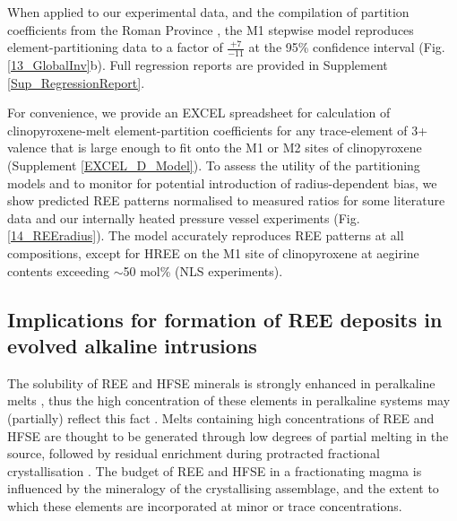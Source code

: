 \documentclass[review,authoryear,12pt]{elsarticle}
\begin{document}
When applied to our experimental data, and the compilation of partition coefficients from the Roman Province \citep{Fedele2009, Mollo2013, Mollo2016}, the M1 stepwise model reproduces element-partitioning data to a factor of $\frac{+7}{-11}$ at the 95\% confidence interval (Fig. \ref{13_GlobalInv}b). Full regression reports are provided in Supplement \ref{Sup_RegressionReport}. 


For convenience, we provide an EXCEL spreadsheet for calculation of clinopyroxene-melt element-partition coefficients for any trace-element of 3+ valence that is large enough to fit onto the M1 or M2 sites of clinopyroxene (Supplement \ref{EXCEL_D_Model}). 
	To assess the utility of the partitioning models and to monitor for potential introduction of radius-dependent bias, we show predicted REE patterns normalised to measured ratios for some literature data and our internally heated pressure vessel experiments (Fig. \ref{14_REEradius}). The model accurately reproduces REE patterns at all compositions, except for HREE on the M1 site of clinopyroxene at aegirine contents exceeding $\sim$50 mol\% (NLS experiments).

		                         

\subsection{Implications for formation of REE deposits in evolved alkaline intrusions}
The solubility of REE and HFSE minerals is strongly enhanced in peralkaline melts \citep{Watson1979, Linnen1997, Boehnke2013, Aseri2015}, thus the high concentration of these elements in peralkaline systems may (partially) reflect this fact \citep{Dostal2017}. Melts containing high concentrations of REE and HFSE are thought to be generated through low degrees of partial melting in the source, followed by residual enrichment during protracted fractional crystallisation \citep{Marks2017}. The budget of REE and HFSE in a fractionating magma is influenced by the mineralogy of the crystallising assemblage, and the extent to which these elements are incorporated at minor or trace concentrations.
\end{document}
